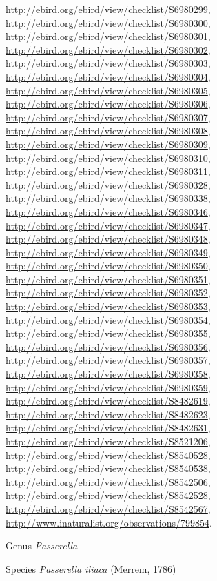 \documentclass[9pt, article]{memoir}
\begin{document}
\begin{multicols}{2}
\url{http://ebird.org/ebird/view/checklist/S6980299}, 
\url{http://ebird.org/ebird/view/checklist/S6980300}, 
\url{http://ebird.org/ebird/view/checklist/S6980301}, 
\url{http://ebird.org/ebird/view/checklist/S6980302}, 
\url{http://ebird.org/ebird/view/checklist/S6980303}, 
\url{http://ebird.org/ebird/view/checklist/S6980304}, 
\url{http://ebird.org/ebird/view/checklist/S6980305}, 
\url{http://ebird.org/ebird/view/checklist/S6980306}, 
\url{http://ebird.org/ebird/view/checklist/S6980307}, 
\url{http://ebird.org/ebird/view/checklist/S6980308}, 
\url{http://ebird.org/ebird/view/checklist/S6980309}, 
\url{http://ebird.org/ebird/view/checklist/S6980310}, 
\url{http://ebird.org/ebird/view/checklist/S6980311}, 
\url{http://ebird.org/ebird/view/checklist/S6980328}, 
\url{http://ebird.org/ebird/view/checklist/S6980338}, 
\url{http://ebird.org/ebird/view/checklist/S6980346}, 
\url{http://ebird.org/ebird/view/checklist/S6980347}, 
\url{http://ebird.org/ebird/view/checklist/S6980348}, 
\url{http://ebird.org/ebird/view/checklist/S6980349}, 
\url{http://ebird.org/ebird/view/checklist/S6980350}, 
\url{http://ebird.org/ebird/view/checklist/S6980351}, 
\url{http://ebird.org/ebird/view/checklist/S6980352}, 
\url{http://ebird.org/ebird/view/checklist/S6980353}, 
\url{http://ebird.org/ebird/view/checklist/S6980354}, 
\url{http://ebird.org/ebird/view/checklist/S6980355}, 
\url{http://ebird.org/ebird/view/checklist/S6980356}, 
\url{http://ebird.org/ebird/view/checklist/S6980357}, 
\url{http://ebird.org/ebird/view/checklist/S6980358}, 
\url{http://ebird.org/ebird/view/checklist/S6980359}, 
\url{http://ebird.org/ebird/view/checklist/S8482619}, 
\url{http://ebird.org/ebird/view/checklist/S8482623}, 
\url{http://ebird.org/ebird/view/checklist/S8482631}, 
\url{http://ebird.org/ebird/view/checklist/S8521206}, 
\url{http://ebird.org/ebird/view/checklist/S8540528}, 
\url{http://ebird.org/ebird/view/checklist/S8540538}, 
\url{http://ebird.org/ebird/view/checklist/S8542506}, 
\url{http://ebird.org/ebird/view/checklist/S8542528}, 
\url{http://ebird.org/ebird/view/checklist/S8542567}, 
\url{http://www.inaturalist.org/observations/799854}.

\vspace{6pt}\noindent\hspace{30pt}Genus \textit{Passerella}


\vspace{6pt}\noindent\hspace{36pt}Species \textit{Passerella iliaca} (Merrem, 1786)



\end{multicols}
\end{document}
